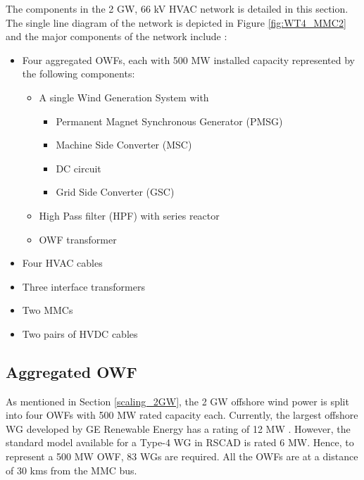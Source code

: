 The components in the 2 GW, 66 kV \gls{HVAC} network is detailed in this section. The single line diagram of the network is depicted in Figure \ref{fig:WT4_MMC2} and the major components of the network include :
\begin{itemize}
    \item Four aggregated \gls{OWF}s, each with 500 MW installed capacity represented by the following components:
    \begin{itemize}
        \item A single Wind Generation System with 
    \begin{itemize}
        \item Permanent Magnet Synchronous Generator (\gls{PMSG})
        \item Machine Side Converter (\gls{MSC})
        \item \gls{DC} circuit
        \item Grid Side Converter (\gls{GSC}) 
    \end{itemize}
        \item High Pass filter (\gls{HPF}) with series reactor
        \item \gls{OWF} transformer
    \end{itemize}
    \item Four \gls{HVAC} cables  
    \item Three interface transformers
    \item Two \gls{MMC}s
    \item Two pairs of \gls{HVDC} cables
\end{itemize}

\subsection{Aggregated OWF}\label{Aggregated_OWF_large_scale}
As mentioned in Section \ref{scaling_2GW}, the 2 GW offshore wind power is split into four \gls{OWF}s with 500 MW rated capacity each. Currently, the largest offshore \gls{WG} developed by GE Renewable Energy has a rating of 12 MW \cite{noauthor_worlds_2020}. However, the standard model available for a Type-4 \gls{WG} in RSCAD is rated 6 MW. Hence, to represent a 500 MW \gls{OWF}, 83 \gls{WG}s are required. All the \gls{OWF}s are at a distance of 30 kms from the \gls{MMC} bus. 


